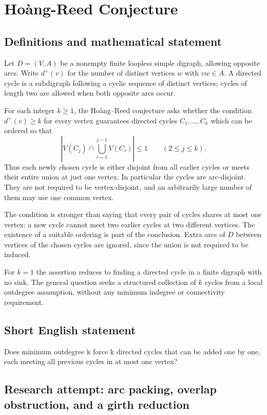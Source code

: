 \documentclass[11pt,a4paper]{article}
\begin{document}
\section*{Hoàng-Reed Conjecture}\label{statement}

\subsection{Definitions and mathematical statement}
Let $D=(V,A)$ be a nonempty finite loopless simple digraph, allowing opposite
arcs. Write $d^+(v)$ for the number of distinct vertices $w$ with
$vw\in A$. A directed cycle is a subdigraph following a cyclic sequence
of distinct vertices; cycles of length two are allowed when both
opposite arcs occur.

For each integer $k\ge1$, the Hoàng--Reed conjecture asks whether the
condition $d^+(v)\ge k$ for every vertex guarantees directed cycles
$C_1,\ldots,C_k$ which can be ordered so that
\[
 \left|V(C_j)\cap\bigcup_{i=1}^{j-1}V(C_i)\right|\le1
                         \qquad(2\le j\le k).
\]
Thus each newly chosen cycle is either disjoint from all earlier cycles
or meets their entire union at just one vertex. In particular the
cycles are arc-disjoint. They are not required to be vertex-disjoint,
and an arbitrarily large number of them may use one common vertex.

The condition is stronger than saying that every pair of cycles shares
at most one vertex: a new cycle cannot meet two earlier cycles at two
different vertices. The existence of a suitable ordering is part of
the conclusion. Extra arcs of $D$ between vertices of the chosen cycles
are ignored, since the union is not required to be induced.

For $k=1$ the assertion reduces to finding a directed cycle in a finite
digraph with no sink. The general question seeks a structured collection
of $k$ cycles from a local outdegree assumption, without any minimum
indegree or connectivity requirement.
\subsection{Short English statement}
Does minimum outdegree k force k directed cycles that can be added one by one, each meeting all previous cycles in at most one vertex?
\subsection{Research attempt: arc packing, overlap obstruction, and a girth reduction}
\end{document}
